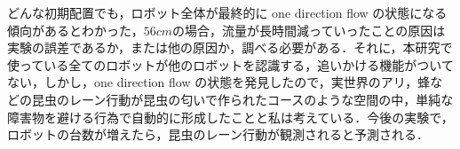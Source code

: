 どんな初期配置でも，ロボット全体が最終的に one direction flow の状態になる傾向があるとわかった，$56cm$の場合，流量が長時間減っていったことの原因は実験の誤差であるか，または他の原因か，調べる必要がある．それに，本研究で使っている全てのロボットが他のロボットを認識する，追いかける機能がついてない，しかし，one direction flow の状態を発見したので，実世界のアリ，蜂などの昆虫のレーン行動が昆虫の匂いで作られたコースのような空間の中，単純な障害物を避ける行為で自動的に形成したことと私は考えている．今後の実験で，ロボットの台数が増えたら，昆虫のレーン行動が観測されると予測される．
